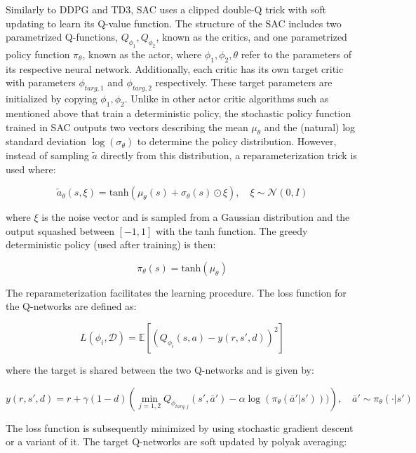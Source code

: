 Similarly to DDPG and TD3, SAC uses a clipped double-Q trick with soft updating to learn its Q-value function. The structure of the SAC includes two parametrized Q-functions, $Q_{\phi_1},Q_{\phi_2}$, known as the critics, and one parametrized policy function $\pi_\theta$, known as the actor, where $\phi_1,\phi_2,\theta$ refer to the parameters of its respective neural network. Additionally, each critic has its own target critic with parameters $\phi_{targ,1}$ and $\phi_{targ,2}$ respectively. These target parameters are initialized by copying  $\phi_1,\phi_2$. Unlike in other actor critic algorithms such as mentioned above that train a deterministic policy, the stochastic policy function trained in SAC outputs two vectors describing the mean $\mu_{\theta}$ and the (natural) log standard deviation $\log(\sigma_\theta)$ to determine the policy distribution. However, instead of sampling $\tilde{a}$ directly from this distribution, a reparameterization trick is used where:

\begin{equation}
	\tilde{a}_{\theta} (s, \xi) = \text{tanh} (\mu_{\theta}(s) + \sigma_{\theta}(s) \odot \xi), \quad \xi \sim \mathcal{N}(0,I)
\end{equation}

where $\xi$ is the noise vector and is sampled from a Gaussian distribution and the output squashed between $[-1,1]$ with the tanh function. The greedy deterministic policy (used after training) is then:

\begin{equation}
\pi_{\theta}(s) = \text{tanh}(\mu_{\theta})
\end{equation}

The reparameterization facilitates the learning procedure. The loss function for the Q-networks are defined as:

\begin{equation}
	L(\phi_i,\mathcal{D}) = \mathbb{E} \left[ \left(Q_{\phi_i}(s,a) - y(r,s',d) \right)^2 \right]
\end{equation}

where the target is shared between the two Q-networks and is given by:

\begin{equation}
	y(r,s',d) = r + \gamma (1-d) \left(\min_{j = 1,2} Q_{\phi_{targ,j}}(s', \bar{a}') - \alpha \log (\pi_{\theta} (\bar{a}'|s')))\right), \quad \bar{a}' \sim \pi_{\theta}(\cdot | s')
\end{equation}

The loss function is subsequently minimized by using stochastic gradient descent or a variant of it. The target Q-networks are soft updated by polyak averaging:

